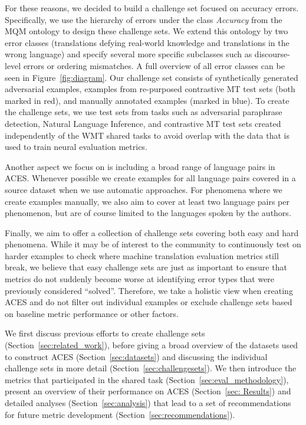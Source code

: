 \documentclass[11pt]{article}
\begin{document}
For these reasons, we decided to build a challenge set focused on accuracy errors. Specifically, we use the hierarchy of errors under the class \textit{Accuracy} from the MQM ontology to design these challenge sets. We extend this ontology by two error classes (translations defying real-world knowledge and translations in the wrong language) and specify several more specific subclasses such as discourse-level errors or ordering mismatches. A full overview of all error classes can be seen in Figure~\ref{fig:diagram}. Our challenge set consists of synthetically generated adversarial examples, examples from re-purposed contrastive MT test sets (both marked in red), and manually annotated examples (marked in blue). To create the challenge sets, we use test sets from tasks such as adversarial paraphrase detection, Natural Language Inference, and contrastive MT test sets created independently of the WMT shared tasks to avoid overlap with the data that is used to train neural evaluation metrics.

Another aspect we focus on is including a broad range of language pairs in \textsc{ACES}. Whenever possible we create examples for all language pairs covered in a source dataset when we use automatic approaches. For phenomena where we create examples manually, we also aim to cover at least two language pairs per phenomenon, but are of course limited to the languages spoken by the authors.

Finally, we aim to offer a collection of challenge sets covering both easy and hard phenomena. While it may be of interest to the community to continuously test on harder examples to check where machine translation evaluation metrics still break, we believe that easy challenge sets are just as important to ensure that metrics do not suddenly become worse at identifying error types that were previously considered ``solved''. Therefore, we take a holistic view when creating \textsc{ACES} and do not filter out individual examples or exclude challenge sets based on baseline metric performance or other factors.

We first discuss previous efforts to create challenge sets (Section~\ref{sec:related_work}), before giving a broad overview of the datasets used to construct \textsc{ACES} (Section~\ref{sec:datasets}) and discussing the individual challenge sets in more detail (Section~\ref{sec:challengesets}). We then introduce the metrics that participated in the shared task (Section~\ref{sec:eval_methodology}), present an overview of their performance on \textsc{ACES} (Section~\ref{sec: Results}) and detailed analyses (Section~\ref{sec:analysis}) that lead to a set of recommendations for future metric development (Section~\ref{sec:recommendations}).
\end{document}
